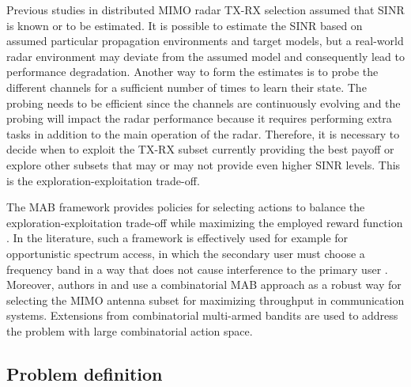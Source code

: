 \documentclass[english, 12pt, a4paper, elec, utf8, a-1b, online]{aaltothesis}
\begin{document}
Previous studies in distributed MIMO radar TX-RX selection assumed that SINR is known or to be estimated.
It is possible to estimate the SINR based on assumed particular propagation environments and target models, but a real-world radar environment may deviate from the assumed model and consequently lead to performance degradation.
Another way to form the estimates is to probe the different channels for a sufficient number of times to learn their state.
The probing needs to be efficient since the channels are continuously evolving and the probing will impact the radar performance because it requires performing extra tasks in addition to the main operation of the radar.  Therefore, it is necessary to decide when to exploit the TX-RX subset currently providing the best payoff or explore other subsets that may or may not provide even higher SINR levels. 
This is the exploration-exploitation trade-off.

The MAB framework provides policies for selecting actions to balance the exploration-exploitation trade-off while maximizing the employed reward function \cite{Lattimore2019}.
In the literature, such a framework is effectively used for example for opportunistic spectrum access, in which the secondary user must choose a frequency band in a way that does not cause interference to the primary user \cite{Zhao2008}.
Moreover, authors in \cite{Mukherjee2012} and \cite{Kuai2019} use a combinatorial MAB approach as a robust way for selecting the MIMO antenna subset for maximizing throughput in communication systems.
Extensions from combinatorial multi-armed bandits are used to address the problem with large combinatorial action space.

\subsection{Problem definition}
\end{document}
